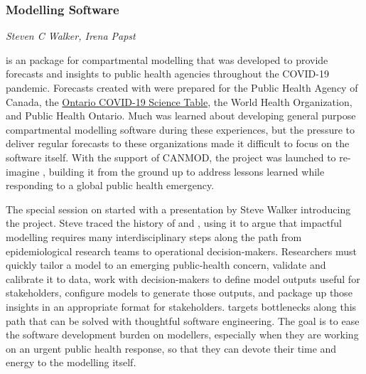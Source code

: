 \subsubsection{\macpan Modelling Software}
\label{sec:macpan}

\textit{Steven C Walker, Irena Papst}

\macpanOrig is an \R package for compartmental modelling that was developed to provide forecasts and insights to public health agencies throughout the COVID-19 pandemic. Forecasts created with \macpanOrig were prepared for the Public Health Agency of Canada, the \href{https://covid19-sciencetable.ca/}{Ontario COVID-19 Science Table}, the World Health Organization, and Public Health Ontario. Much was learned about developing general purpose compartmental modelling software during these experiences, but the pressure to deliver regular forecasts to these organizations made it difficult to focus on the software itself. With the support of CANMOD, the \macpan project was launched to re-imagine \macpanOrig, building it from the ground up to address lessons learned while responding to a global public health emergency.

The special session on \macpan started with a presentation by Steve Walker introducing the project. Steve traced the history of \macpanOrig and \macpan, using it to argue that impactful modelling requires many interdisciplinary steps along the path from epidemiological research teams to operational decision-makers. Researchers must quickly tailor a model to an emerging public-health concern, validate and calibrate it to data, work with decision-makers to define model outputs useful for stakeholders, configure models to generate those outputs, and package up those insights in an appropriate format for stakeholders. \macpan targets bottlenecks along this path that can be solved with thoughtful software engineering. The goal is to ease the software development burden on modellers, especially when they are working on an urgent public health response, so that they can devote their time and energy to the modelling itself.

